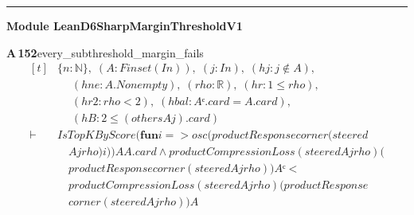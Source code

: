 \documentclass[conference]{IEEEtran}
\theoremstyle{definition}
\newcommand{\lean}[1]{\textsf{\footnotesize #1}}
\begin{document}
\vspace{4pt}\noindent\rule{\columnwidth}{0.4pt}\par\vspace{2pt}
\noindent\textbf{Module \lean{LeanD6SharpMarginThresholdV1}}\par\vspace{3pt}

\noindent\textbf{A\,152}\quad\lean{every\_subthreshold\_margin\_fails}
{\footnotesize\[ \begin{aligned}[t]
&\{ \mathit{n} : \mathbb{N} \},\; (\mathit{A} : \mathit{Finset} (\mathit{I} \mathit{n})),\; (\mathit{j} : \mathit{I} \mathit{n}),\; (\mathit{hj} : \mathit{j} \notin \mathit{A}),\\
&\quad \; (\mathit{hne} : \mathit{A}.\mathit{Nonempty}),\; (\mathit{rho} : \mathbb{R} ),\; (\mathit{hr} : 1 \leq \mathit{rho}),\\
&\quad \; (\mathit{hr2} : \mathit{rho} < 2),\; (\mathit{hbal} : \mathit{Aᶜ}.\mathit{card}=\mathit{A}.\mathit{card}),\\
&\quad \; (\mathit{hB} : 2 \leq (\mathit{others} \mathit{A} \mathit{j}).\mathit{card})\\
\vdash\;&\mathit{IsTopKByScore} (\mathbf{fun} \mathit{i} => \mathit{osc} (\mathit{productResponse} \mathit{corner} (\mathit{steered}\\
&\quad \mathit{A} \mathit{j} \mathit{rho}) \mathit{i})) \mathit{A} \mathit{A}.\mathit{card} \wedge \mathit{productCompressionLoss} (\mathit{steered} \mathit{A} \mathit{j} \mathit{rho}) (\\
&\quad \mathit{productResponse} \mathit{corner} (\mathit{steered} \mathit{A} \mathit{j} \mathit{rho})) \mathit{Aᶜ} <\\
&\quad \mathit{productCompressionLoss} (\mathit{steered} \mathit{A} \mathit{j} \mathit{rho}) (\mathit{productResponse}\\
&\quad \mathit{corner} (\mathit{steered} \mathit{A} \mathit{j} \mathit{rho})) \mathit{A}
\end{aligned} \]}
\end{document}
